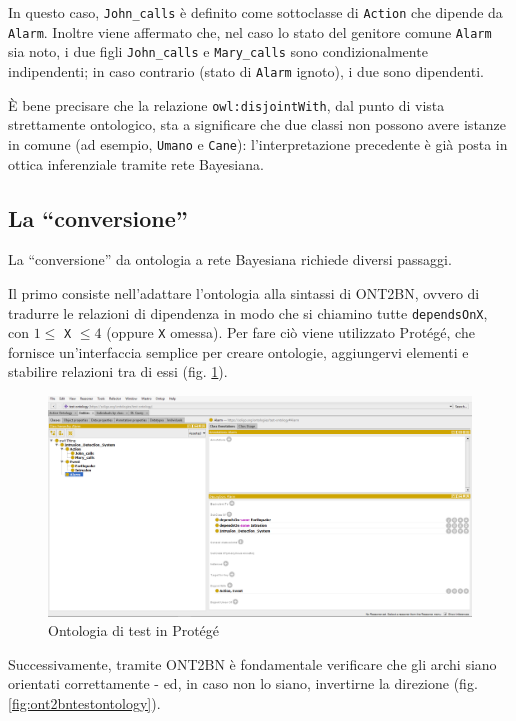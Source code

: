 In questo caso, \texttt{John\_calls} è definito come sottoclasse di \texttt{Action} che dipende da \texttt{Alarm}. 
Inoltre viene affermato che, nel caso lo stato del genitore comune \texttt{Alarm} sia noto, i due figli \texttt{John\_calls} e \texttt{Mary\_calls} sono condizionalmente indipendenti; in caso contrario (stato di \texttt{Alarm} ignoto), i due sono dipendenti.

È bene precisare che la relazione \texttt{owl:disjointWith}, dal punto di vista strettamente ontologico, sta a significare che due classi non possono avere istanze in comune (ad esempio, \texttt{Umano} e \texttt{Cane}): l'interpretazione precedente è già posta in ottica inferenziale tramite rete Bayesiana.


\subsection{La ``conversione''}
La ``conversione'' da ontologia a rete Bayesiana richiede diversi passaggi.

Il primo consiste nell'adattare l'ontologia alla sintassi di ONT2BN, ovvero di tradurre le relazioni di dipendenza in modo che si chiamino tutte \texttt{dependsOnX}, con $1 \le$ \texttt{X} $\le 4$ (oppure \texttt{X} omessa). Per fare ciò viene utilizzato Protégé, che fornisce un'interfaccia semplice per creare ontologie, aggiungervi elementi e stabilire relazioni tra di essi (fig. \ref{fig:protegetestontology}).

\begin{figure}[H]
	\centering
	\includegraphics[width=\linewidth]{../images/protege_test_ontology}
	\caption{Ontologia di test in Protégé}
	\label{fig:protegetestontology}
\end{figure}

\clearpage
Successivamente, tramite ONT2BN è fondamentale verificare che gli archi siano orientati correttamente - ed, in caso non lo siano, invertirne la direzione (fig. \ref{fig:ont2bntestontology}). 

